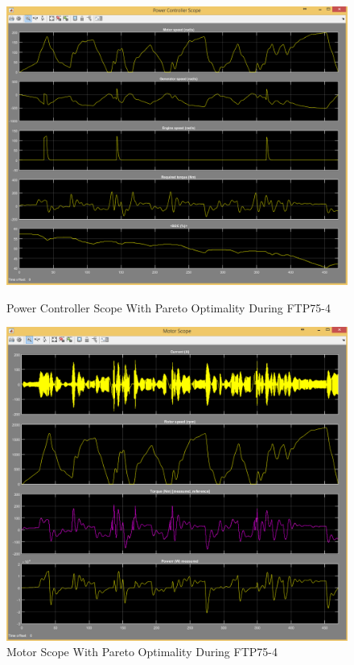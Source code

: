 \begin{figure}[hp]
\centering
\includegraphics[scale=0.455]{figures/Pareto/FTP75-4/powerController05Juli}
\caption{Power Controller Scope With Pareto Optimality During FTP75-4}
\label{fig:pcpo4}
\includegraphics[scale=0.49]{figures/Pareto/FTP75-4/motor05Juli}
\caption{Motor Scope With Pareto Optimality During FTP75-4}
\label{fig:mpo4}
\end{figure}

